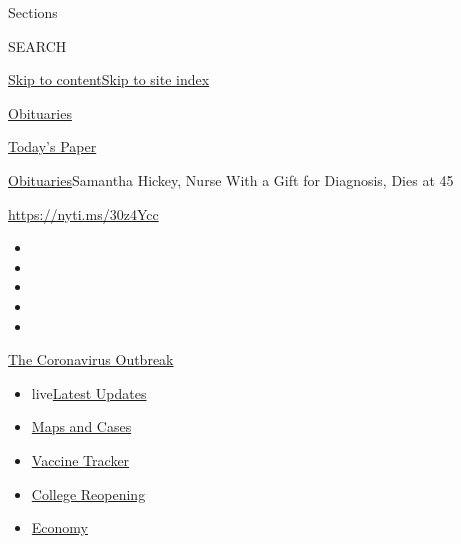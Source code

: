 Sections

SEARCH

\protect\hyperlink{site-content}{Skip to
content}\protect\hyperlink{site-index}{Skip to site index}

\href{https://www.nytimes3xbfgragh.onion/section/obituaries}{Obituaries}

\href{https://myaccount.nytimes3xbfgragh.onion/auth/login?response_type=cookie\&client_id=vi}{}

\href{https://www.nytimes3xbfgragh.onion/section/todayspaper}{Today's
Paper}

\href{/section/obituaries}{Obituaries}\textbar{}Samantha Hickey, Nurse
With a Gift for Diagnosis, Dies at 45

\url{https://nyti.ms/30z4Ycc}

\begin{itemize}
\item
\item
\item
\item
\item
\end{itemize}

\href{https://www.nytimes3xbfgragh.onion/news-event/coronavirus?action=click\&pgtype=Article\&state=default\&region=TOP_BANNER\&context=storylines_menu}{The
Coronavirus Outbreak}

\begin{itemize}
\tightlist
\item
  live\href{https://www.nytimes3xbfgragh.onion/2020/08/04/world/coronavirus-covid-19.html?action=click\&pgtype=Article\&state=default\&region=TOP_BANNER\&context=storylines_menu}{Latest
  Updates}
\item
  \href{https://www.nytimes3xbfgragh.onion/interactive/2020/us/coronavirus-us-cases.html?action=click\&pgtype=Article\&state=default\&region=TOP_BANNER\&context=storylines_menu}{Maps
  and Cases}
\item
  \href{https://www.nytimes3xbfgragh.onion/interactive/2020/science/coronavirus-vaccine-tracker.html?action=click\&pgtype=Article\&state=default\&region=TOP_BANNER\&context=storylines_menu}{Vaccine
  Tracker}
\item
  \href{https://www.nytimes3xbfgragh.onion/2020/08/02/us/covid-college-reopening.html?action=click\&pgtype=Article\&state=default\&region=TOP_BANNER\&context=storylines_menu}{College
  Reopening}
\item
  \href{https://www.nytimes3xbfgragh.onion/live/2020/08/03/business/stock-market-today-coronavirus?action=click\&pgtype=Article\&state=default\&region=TOP_BANNER\&context=storylines_menu}{Economy}
\end{itemize}

